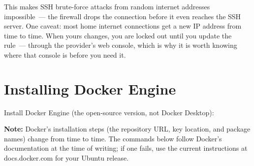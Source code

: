 \noindent{}This makes SSH brute-force attacks from random internet addresses impossible~--- the firewall drops the connection before it even reaches the SSH server. One caveat: most home internet connections get a new IP address from time to time. When yours changes, you are locked out until you update the rule~--- through the provider's web console, which is why it is worth knowing where that console is before you need it.

\setcounter{section}{5}
\section{Installing Docker Engine}\label{21-system-setup:216-installing-docker-engine}

Install Docker Engine (the open-source version, not Docker Desktop):

\begin{notebox}

\textbf{Note:} Docker's installation steps (the repository URL, key location, and package names) change from time to time. The commands below follow Docker's documentation at the time of writing; if one fails, use the current instructions at docs.docker.com for your Ubuntu release.

\end{notebox}

